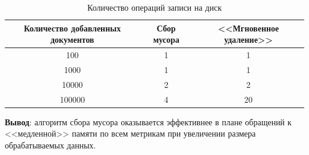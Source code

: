 \begin{table}[H]
      \caption{Количество операций записи на диск}
      \centering
      \small
      \singlespacing
      \begin{tabular}{|c|c|c|}
            \hline
            Количество добавленных документов   & Сбор мусора                 & <<Мгновенное удаление>>     \\ \hline \hline
            100                                 & 1                           & 1                           \\ \hline
            1000                                & 1                           & 1                           \\ \hline
            10000                               & 2                           & 2                           \\ \hline
            100000                              & 4                           & 20                          \\ \hline
\end{tabular}
\end{table}

\textbf{Вывод}: алгоритм сбора мусора оказывается эффективнее в плане
обращений к <<медленной>> памяти по всем метрикам при увеличении размера 
обрабатываемых данных.

